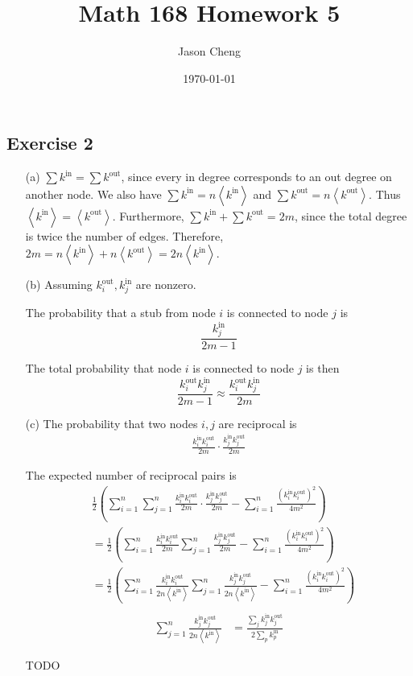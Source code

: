 \documentclass{article}
\title{Math 168 Homework 5}
\author{Jason Cheng}
\date{\today}
\newcommand{\angles}[1]{\left \langle #1 \right \rangle}
\begin{document}
\maketitle

\subsection*{Exercise 2}

\begin{enumerate}
  \item[(a)]
  \newcommand{\kin}{k^{\text{in}}}
  \newcommand{\kout}{k^{\text{out}}}
  \newcommand{\akin}{\angles{\kin}}
  \newcommand{\akout}{\angles{\kout}}
  \( \sum \kin = \sum \kout \), since every in degree corresponds to an out
  degree on another node. We also have \( \sum \kin = n \akin \) and \( \sum
  \kout = n \akout \). Thus \( \akin = \akout \). Furthermore, \( \sum \kin +
  \sum \kout = 2m \), since the total degree is twice the number of edges.
  Therefore, \( 2m = n \akin + n \akout = 2n \akin \).

  \item[(b)]
  Assuming \( \kout_i, \kin_j \) are nonzero.

  The probability that a stub from node \( i \) is connected to node \( j \) is
  \[ \frac{\kin_j}{2m - 1} \]

  The total probability that node \( i \) is connected to node \( j \) is then
  \[ \frac{\kout_i \kin_j}{2m - 1} \approx \frac{\kout_i \kin_j}{2m} \]

  \item[(c)]
  The probability that two nodes \( i, j \) are reciprocal is
  \begin{align*}
    \frac{\kin_i \kout_i}{2m} \cdot \frac{\kin_j \kout_j}{2m}
  \end{align*}

  The expected number of reciprocal pairs is
  \begin{align*}
    &\frac{1}{2} \left( \sum_{i = 1}^{n} \sum_{j = 1}^{n} \frac{\kin_i \kout_i}{2m} \cdot \frac{\kin_j \kout_j}{2m} - \sum_{i = 1}^{n} \frac{(\kin_i \kout_i)^2}{4m^2} \right) \\
    &= \frac{1}{2} \left( \sum_{i = 1}^{n} \frac{\kin_i \kout_i}{2m} \sum_{j = 1}^{n} \frac{\kin_j \kout_j}{2m} - \sum_{i = 1}^{n} \frac{(\kin_i \kout_i)^2}{4m^2} \right) \\
    &= \frac{1}{2} \left( \sum_{i = 1}^{n} \frac{\kin_i \kout_i}{2n \akin} \sum_{j = 1}^{n} \frac{\kin_j \kout_j}{2n \akin} - \sum_{i = 1}^{n} \frac{(\kin_i \kout_i)^2}{4m^2} \right) \\
  \end{align*}
  \begin{align*}
    \sum_{j = 1}^{n} \frac{\kin_j \kout_j}{2n \akin}
    &= \frac{\sum_j \kin_j \kout_j}{2 \sum_{p} \kin_p}
  \end{align*}

  TODO
\end{enumerate}
\end{document}
